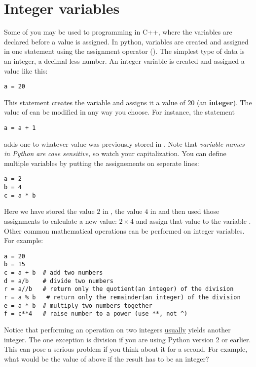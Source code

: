 \section{Integer variables}
Some of you may be used to programming in C++, where
the variables are declared before a value is assigned.  In python,
variables are created and assigned in one statement using the
assignment operator (\code{=}).  The simplest type of data is an
integer, a decimal-less number.  An integer variable is created and
assigned a value like this:
\begin{Verbatim}
a = 20
\end{Verbatim}
This statement creates the variable  and assigns it a value of
$20$ (an \textbf{integer}).  The value of  can be modified in
any way you choose.  For instance, the statement
\begin{Verbatim}
a = a + 1
\end{Verbatim}
adds one to whatever value was previously stored in
.   Note that {\it variable names
  in Python are case sensitive,} so watch your capitalization.
You can define multiple variables by putting the assignements on
seperate lines:
\begin{Verbatim}
a = 2
b = 4
c = a * b
\end{Verbatim}
Here we have stored the value $2$ in , the value $4$ in
 and then used those assignments to calculate a new value: $ 2
\times 4$ and assign that value to the variable .
Other common mathematical operations can be performed on integer
variables.  For example:
\begin{Verbatim}
a = 20
b = 15
c = a + b  # add two numbers
d = a/b    # divide two numbers
r = a//b   # return only the quotient(an integer) of the division
r = a % b   # return only the remainder(an integer) of the division
e = a * b  # multiply two numbers together
f = c**4   # raise number to a power (use **, not ^)
\end{Verbatim}
Notice that performing an operation on two integers \ul{usually}
yields another integer.  The one exception is division if you are
using Python version 2 or earlier.  This can pose a serious problem if
you think about it for a second.  For example, what would be the value
of  above if the result has to be an integer?

